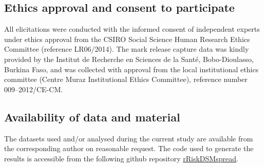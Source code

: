 \documentclass[]{bmcart}
\begin{document}
\begin{backmatter}
\subsection*{Ethics approval and consent to participate}
All elicitations were conducted with the informed consent of independent experts under ethics approval from the CSIRO Social Science Human Research Ethics Committee (reference LR06/2014). The mark release capture data was kindly provided by the Institut de Recherche en Sciences de la Sant\'{e}, Bobo-Dioulasso, Burkina Faso, and was collected with approval from the local institutional ethics committee (Centre Muraz Institutional Ethics Committee), reference number 009–2012/CE-CM.

\subsection*{Availability of data and material}

The datasets used and/or analysed during the current study are available from the corresponding author on reasonable request. The code used to generate the results is accessible from the following github repository \href{https://github.com/ick003/rRiskDSMspread}{rRiskDSMspread}.




\end{backmatter}
\end{document}

